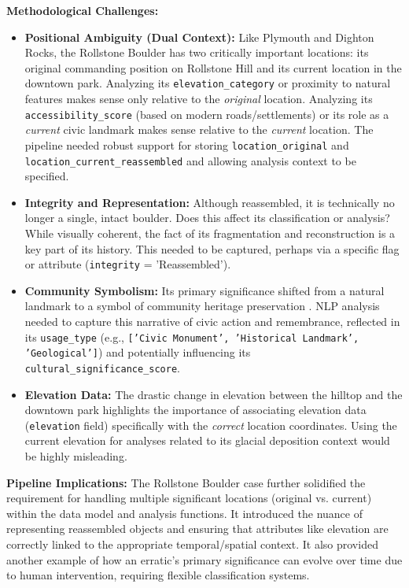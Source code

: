 \documentclass[
11pt, %
english, %
singlespacing, %
headsepline, %
]{MastersDoctoralThesis} %
\begin{document}
\textbf{Methodological Challenges:}
\begin{itemize}
    \item \textbf{Positional Ambiguity (Dual Context):} Like Plymouth and Dighton Rocks, the Rollstone Boulder has two critically important locations: its original commanding position on Rollstone Hill and its current location in the downtown park. Analyzing its \texttt{elevation\_category} or proximity to natural features makes sense only relative to the \emph{original} location. Analyzing its \texttt{accessibility\_score} (based on modern roads/settlements) or its role as a \emph{current} civic landmark makes sense relative to the \emph{current} location. The pipeline needed robust support for storing \texttt{location\_original} and \texttt{location\_current\_reassembled} and allowing analysis context to be specified.
    \item \textbf{Integrity and Representation:} Although reassembled, it is technically no longer a single, intact boulder. Does this affect its classification or analysis? While visually coherent, the fact of its fragmentation and reconstruction is a key part of its history. This needed to be captured, perhaps via a specific flag or attribute (\texttt{integrity} = 'Reassembled').
    \item \textbf{Community Symbolism:} Its primary significance shifted from a natural landmark to a symbol of community heritage preservation \cite{googleLewistonEvening}. NLP analysis needed to capture this narrative of civic action and remembrance, reflected in its \texttt{usage\_type} (e.g., \texttt{['Civic Monument', 'Historical Landmark', 'Geological']}) and potentially influencing its \texttt{cultural\_significance\_score}.
    \item \textbf{Elevation Data:} The drastic change in elevation between the hilltop and the downtown park highlights the importance of associating elevation data (\texttt{elevation} field) specifically with the \emph{correct} location coordinates. Using the current elevation for analyses related to its glacial deposition context would be highly misleading.
\end{itemize}

\textbf{Pipeline Implications:} The Rollstone Boulder case further solidified the requirement for handling multiple significant locations (original vs. current) within the data model and analysis functions. It introduced the nuance of representing reassembled objects and ensuring that attributes like elevation are correctly linked to the appropriate temporal/spatial context. It also provided another example of how an erratic's primary significance can evolve over time due to human intervention, requiring flexible classification systems.
\end{document}
